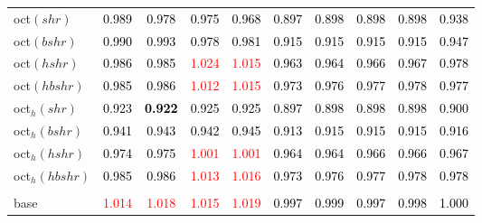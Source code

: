 \begin{tabular}[t]{>{\centering\arraybackslash}m{2.5cm}ccccccccc}
oct$(shr)$ & \textcolor{black}{0.989} & \textcolor{black}{0.978} & \textcolor{black}{0.975} & \textcolor{black}{0.968} & \textcolor{black}{0.897} & \textcolor{black}{0.898} & \textcolor{black}{0.898} & \textcolor{black}{0.898} & \textcolor{black}{0.938}\\
oct$(bshr)$ & \textcolor{black}{0.990} & \textcolor{black}{0.993} & \textcolor{black}{0.978} & \textcolor{black}{0.981} & \textcolor{black}{0.915} & \textcolor{black}{0.915} & \textcolor{black}{0.915} & \textcolor{black}{0.915} & \textcolor{black}{0.947}\\
oct$(hshr)$ & \textcolor{black}{0.986} & \textcolor{black}{0.985} & \textcolor{red}{1.024} & \textcolor{red}{1.015} & \textcolor{black}{0.963} & \textcolor{black}{0.964} & \textcolor{black}{0.966} & \textcolor{black}{0.967} & \textcolor{black}{0.978}\\
oct$(hbshr)$ & \textcolor{black}{0.985} & \textcolor{black}{0.986} & \textcolor{red}{1.012} & \textcolor{red}{1.015} & \textcolor{black}{0.973} & \textcolor{black}{0.976} & \textcolor{black}{0.977} & \textcolor{black}{0.978} & \textcolor{black}{0.977}\\
oct$_h(shr)$ & \textcolor{black}{0.923} & \textcolor{black}{\textbf{0.922}} & \textcolor{black}{0.925} & \textcolor{black}{0.925} & \textcolor{black}{0.897} & \textcolor{black}{0.898} & \textcolor{black}{0.898} & \textcolor{black}{0.898} & \textcolor{black}{0.900}\\
oct$_h(bshr)$ & \textcolor{black}{0.941} & \textcolor{black}{0.943} & \textcolor{black}{0.942} & \textcolor{black}{0.945} & \textcolor{black}{0.913} & \textcolor{black}{0.915} & \textcolor{black}{0.915} & \textcolor{black}{0.915} & \textcolor{black}{0.916}\\
oct$_h(hshr)$ & \textcolor{black}{0.974} & \textcolor{black}{0.975} & \textcolor{red}{1.001} & \textcolor{red}{1.001} & \textcolor{black}{0.964} & \textcolor{black}{0.964} & \textcolor{black}{0.966} & \textcolor{black}{0.966} & \textcolor{black}{0.967}\\
oct$_h(hbshr)$ & \textcolor{black}{0.985} & \textcolor{black}{0.986} & \textcolor{red}{1.013} & \textcolor{red}{1.016} & \textcolor{black}{0.973} & \textcolor{black}{0.976} & \textcolor{black}{0.977} & \textcolor{black}{0.978} & \textcolor{black}{0.978}\\
\addlinespace[0.3em]
\multicolumn{10}{c}{\textbf{$k = 1$}}\\
base & \textcolor{red}{1.014} & \textcolor{red}{1.018} & \textcolor{red}{1.015} & \textcolor{red}{1.019} & \textcolor{black}{0.997} & \textcolor{black}{0.999} & \textcolor{black}{0.997} & \textcolor{black}{0.998} & \textcolor{black}{1.000}\\

\end{tabular}

